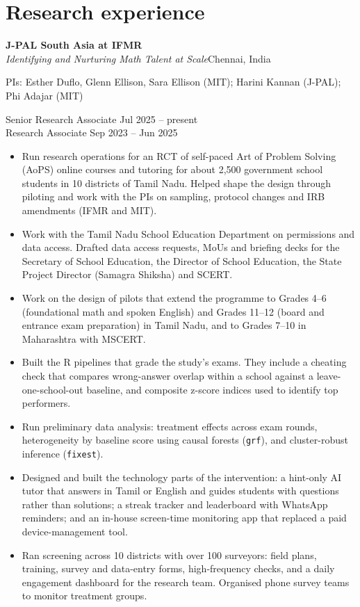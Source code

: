 \documentclass[11pt,a4paper]{article}
\newcommand{\entry}[4]{\noindent\textbf{#1}\hfill #2\\ \textit{#3}\hfill #4\par}
\begin{document}
\section{Research experience}
\entry{J-PAL South Asia at IFMR}{}{Identifying and Nurturing Math Talent at Scale}{Chennai, India}
\noindent PIs: Esther Duflo, Glenn Ellison, Sara Ellison (MIT); Harini Kannan (J-PAL); Phi Adajar (MIT)\par
\vspace{3pt}
\noindent Senior Research Associate \hfill Jul 2025 -- present\\
Research Associate \hfill Sep 2023 -- Jun 2025
\begin{itemize}
  \item Run research operations for an RCT of self-paced Art of Problem Solving (AoPS) online courses and tutoring for about 2,500 government school students in 10 districts of Tamil Nadu. Helped shape the design through piloting and work with the PIs on sampling, protocol changes and IRB amendments (IFMR and MIT).
  \item Work with the Tamil Nadu School Education Department on permissions and data access. Drafted data access requests, MoUs and briefing decks for the Secretary of School Education, the Director of School Education, the State Project Director (Samagra Shiksha) and SCERT.
  \item Work on the design of pilots that extend the programme to Grades 4--6 (foundational math and spoken English) and Grades 11--12 (board and entrance exam preparation) in Tamil Nadu, and to Grades 7--10 in Maharashtra with MSCERT.
  \item Built the R pipelines that grade the study's exams. They include a cheating check that compares wrong-answer overlap within a school against a leave-one-school-out baseline, and composite z-score indices used to identify top performers.
  \item Run preliminary data analysis: treatment effects across exam rounds, heterogeneity by baseline score using causal forests (\texttt{grf}), and cluster-robust inference (\texttt{fixest}).
  \item Designed and built the technology parts of the intervention: a hint-only AI tutor that answers in Tamil or English and guides students with questions rather than solutions; a streak tracker and leaderboard with WhatsApp reminders; and an in-house screen-time monitoring app that replaced a paid device-management tool.
  \item Ran screening across 10 districts with over 100 surveyors: field plans, training, survey and data-entry forms, high-frequency checks, and a daily engagement dashboard for the research team. Organised phone survey teams to monitor treatment groups.
\end{itemize}
\end{document}
